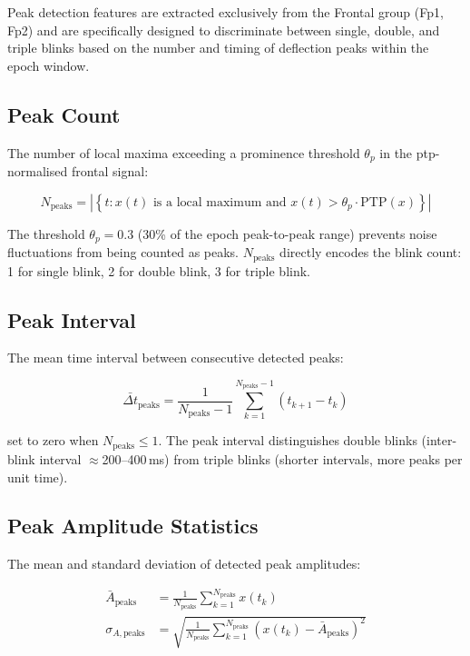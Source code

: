 Peak detection features are extracted exclusively from the
Frontal group (Fp1, Fp2) and are specifically designed to
discriminate between single, double, and triple blinks based
on the number and timing of deflection peaks within the
epoch window.

\subsection{Peak Count}

The number of local maxima exceeding a prominence threshold
$\theta_p$ in the \acrshort{ptp}-normalised frontal signal:

\begin{equation}
N_{\text{peaks}} = \left|\left\{t : x(t) \text{ is a local
maximum and } x(t) > \theta_p \cdot \text{PTP}(x)\right\}\right|
\label{eq:peak_count}
\end{equation}

The threshold $\theta_p = 0.3$ (30\% of the epoch
peak-to-peak range) prevents noise fluctuations from being
counted as peaks. $N_{\text{peaks}}$ directly encodes the
blink count: 1 for single blink, 2 for double blink, 3 for
triple blink.

\subsection{Peak Interval}

The mean time interval between consecutive detected peaks:

\begin{equation}
\bar{\Delta t}_{\text{peaks}} = \frac{1}{N_{\text{peaks}}-1}
\sum_{k=1}^{N_{\text{peaks}}-1} (t_{k+1} - t_k)
\label{eq:peak_interval}
\end{equation}

\noindent set to zero when $N_{\text{peaks}} \leq 1$.
The peak interval distinguishes double blinks (inter-blink
interval $\approx$200--400\,ms) from triple blinks
(shorter intervals, more peaks per unit time).

\subsection{Peak Amplitude Statistics}

The mean and standard deviation of detected peak amplitudes:

\begin{align}
\bar{A}_{\text{peaks}} &= \frac{1}{N_{\text{peaks}}}
\sum_{k=1}^{N_{\text{peaks}}} x(t_k)
\label{eq:peak_mean} \\
\sigma_{A,\text{peaks}} &= \sqrt{\frac{1}{N_{\text{peaks}}}
\sum_{k=1}^{N_{\text{peaks}}}
\left(x(t_k) - \bar{A}_{\text{peaks}}\right)^2}
\label{eq:peak_std}
\end{align}

